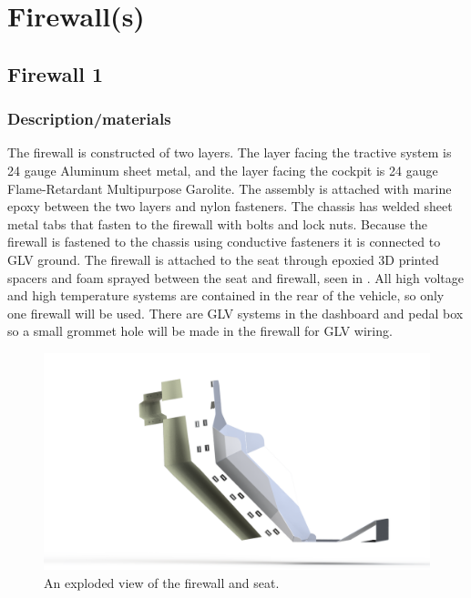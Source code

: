 \documentclass{article}
\begin{document}
\section{Firewall(s)}\label{firewalls}
\subsection{Firewall 1}\label{firewall_1}
\subsubsection{Description/materials}
The firewall is constructed of two layers. The layer facing the tractive system is 24 gauge Aluminum sheet metal, and the layer facing the cockpit is 24 gauge Flame-Retardant Multipurpose Garolite. The assembly is attached with marine epoxy between the two layers and nylon fasteners. The chassis has welded sheet metal tabs that fasten to the firewall with bolts and lock nuts. Because the firewall is fastened to the chassis using conductive fasteners it is connected to GLV ground. The firewall is attached to the seat through epoxied 3D printed spacers and foam sprayed between the seat and firewall, seen in .
All high voltage and high temperature systems are contained in the rear of the vehicle, so only one firewall will be used. There are GLV systems in the dashboard and pedal box so a small grommet hole will be made in the firewall for GLV wiring.

\begin{figure}[H]
    \centering
    \includegraphics[width = 1 \textwidth]{firewall_exploded.png}
    \caption{An exploded view of the firewall and seat. }
    \label{fig:firewall_exploded}
\end{figure}
\end{document}
